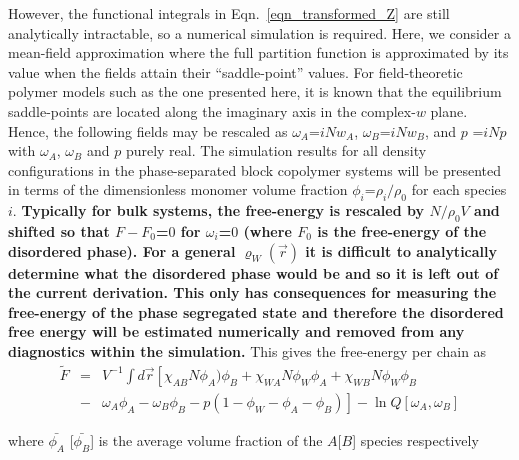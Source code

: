 \documentclass[onecolumn,amsmath,amssymb,floatfix]{elsart}
\begin{document}
However, the functional integrals in Eqn.~\ref{eqn_transformed_Z} are still
analytically intractable, so a numerical simulation is required.
Here, we consider a mean-field approximation where the full
partition function is approximated by its value when the fields
attain their ``saddle-point'' values.
For field-theoretic polymer models such
as the one presented here, it is known that \cite{glenn_review_02}
the equilibrium saddle-points are located along the imaginary axis in
the complex-$w$ plane. 
Hence, the following fields may be rescaled
as $\omega_A$=$i N w_A$, $\omega_B$=$i N w_B$, and $p$  =$i N p$
with $\omega_A$, $\omega_B$ and $p$ purely real.
The simulation results for all density configurations in the phase-separated
block copolymer systems will be presented in terms of the
dimensionless monomer volume fraction $\phi_i$=$\rho_i / \rho_0$ for each species $i$.
{\bf
Typically for bulk systems, the free-energy is rescaled by
$N/\rho_0 V$ and shifted so that $F-F_0$=$0$ for $\omega_i$=$0$
(where $F_0$ is the free-energy of the disordered phase).
For a general $\varrho_W({\vec r})$ it is difficult to analytically determine
what the disordered phase would be and so it is left out of the current
derivation. This only has consequences for measuring the free-energy of
the phase segregated state and therefore the disordered free energy will
be estimated numerically and removed from any diagnostics within the simulation.
}
This gives the free-energy per chain as
%
 \begin{eqnarray}
 {\tilde F}
 \nonumber
 & = &
  V^{-1} \int d{\vec r}
   \left [
     \chi_{AB} N \phi_A) \phi_B
   + \chi_{WA} N \phi_W \phi_A
   + \chi_{WB} N \phi_W \phi_B \right . \\
  & - &
  \omega_A \phi_A - \omega_B \phi_B - p(1 - \phi_W - \phi_A - \phi_B) \left . \right ]
    - \ln Q[\omega_A,\omega_B]
 \end{eqnarray}
%

%
where $\bar{\phi_A}$ [$\bar{\phi_B}$] is the average
volume fraction of the $A$[$B$] species respectively
\end{document}
